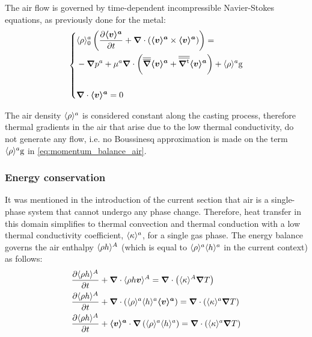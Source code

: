 The air flow is governed by time-dependent incompressible Navier-Stokes equations, as previously done for the metal:
\begin{equation}
\label{eq:momentum_balance_air}
   \left\{
   \begin{aligned}
      & \rhoa_0 \brac{\tempup{ \va } + \nabvec \cdot \brac{\va \times \va}} = \\
	  &- \nabvec \pa + \mua \nabvec \cdot \brac{\nabmat \va + \nabmattransp \va}
	   + \rhoa \gravity\\ \\
      & \nabvec \cdot \va = 0
    \end{aligned}
    \right.
\end{equation}

The air density $\langle \rho \rangle^a$ is considered constant along the casting process, 
therefore thermal gradients in the air that arise due to the low
thermal conductivity, do not generate any flow, i.e. no Boussinesq approximation 
is made on the term $\langle \rho \rangle^a \boldsymbol{\text{g}}$ in \cref{eq:momentum_balance_air}.


\subsubsection{Energy conservation}

It was mentioned in the introduction of the current section that air is a single-phase system
that cannot undergo any phase change. Therefore, heat transfer in this domain simplifies to thermal convection
and thermal conduction with a low thermal conductivity coefficient, $\langle \kappa \rangle^a$, for a single gas phase.
The energy balance governs the air enthalpy $\langle \rho h \rangle^A$ (which is equal to $\langle \rho \rangle^a \langle h \rangle^a$ 
in the current context) as follows:
\begin{subequations}
\begin{align}
	& \tempup{\avg{\rho h}^A} + \nabvec \cdot \avg{\rho h \vec{v}}^A 
	= \nabvec  \cdot \brac{\avg{\kappa}^A \nabvec T } \\
	& \tempup{\avg{\rho h}^A} + \nabvec \cdot \brac{ \rhoa \ha \va} 
	= \nabvec  \cdot \brac{\ka\nabvec T } \\
	\label{eq:energy_balance_air}
	& \tempup{\avg{\rho h}^A}
		+ \va \cdot \nabvec \brac{\rhoa \ha}
		= \nabvec  \cdot \brac{\ka\nabvec T }
\end{align}
\end{subequations}

